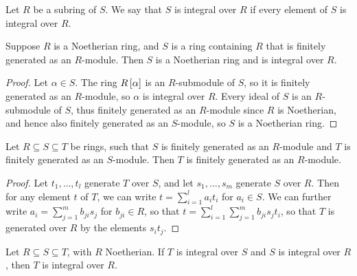 \begin{definition}
Let $ R $ be a subring of $ S $. We say that $ S $ is integral over $ R $ if every element of $ S $ is integral over $ R $.
\end{definition}

\begin{proposition}
Suppose $ R $ is a Noetherian ring, and $ S $ is a ring containing $ R $ that is finitely generated as an $ R $-module. Then $ S $ is a Noetherian ring and is integral over $ R $.
\end{proposition}

\begin{proof}
Let $ \alpha \in S $. The ring $ R\sbr{\alpha} $ is an $ R $-submodule of $ S $, so it is finitely generated as an $ R $-module, so $ \alpha $ is integral over $ R $. Every ideal of $ S $ is an $ R $-submodule of $ S $, thus finitely generated as an $ R $-module since $ R $ is Noetherian, and hence also finitely generated as an $ S $-module, so $ S $ is a Noetherian ring.
\end{proof}

\begin{lemma}
\label{lem:10.1.6}
Let $ R \subseteq S \subseteq T $ be rings, such that $ S $ is finitely generated as an $ R $-module and $ T $ is finitely generated as an $ S $-module. Then $ T $ is finitely generated as an $ R $-module.
\end{lemma}

\begin{proof}
Let $ t_1, \dots, t_l $ generate $ T $ over $ S $, and let $ s_1, \dots, s_m $ generate $ S $ over $ R $. Then for any element $ t $ of $ T $, we can write $ t = \sum_{i = 1}^l a_it_i $ for $ a_i \in S $. We can further write $ a_i = \sum_{j = 1}^m b_{ji}s_j $ for $ b_{ji} \in R $, so that $ t = \sum_{i = 1}^l \sum_{j = 1}^m b_{ji}s_jt_i $, so that $ T $ is generated over $ R $ by the elements $ s_it_j $.
\end{proof}

\begin{corollary}
Let $ R \subseteq S \subseteq T $, with $ R $ Noetherian. If $ T $ is integral over $ S $ and $ S $ is integral over $ R $, then $ T $ is integral over $ R $.
\end{corollary}

